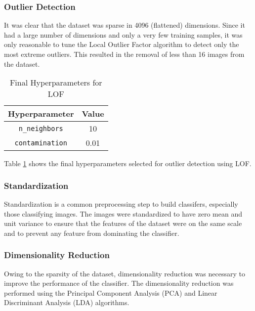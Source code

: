 \documentclass[conference]{IEEEtran}
\begin{document}
    \subsubsection{Outlier Detection}
    \label{sec:outlierdetection}
    It was clear that the dataset was sparse in 4096 (flattened) dimensions.
    Since it had a large number of dimensions and only a very few training samples, it was only reasonable to tune the
    Local Outlier Factor algorithm to detect only the most extreme outliers.
    This resulted in the removal of less than 16 images from the dataset.

    \begin{table}[htbp]
        \caption{Final Hyperparameters for LOF}
        \begin{center}
            \begin{tabular}{|c|c|}
                \hline
                \textbf{Hyperparameter} & \textbf{Value} \\
                \hline
                \texttt{n\_neighbors} & 10 \\
                \hline
                \texttt{contamination} & 0.01 \\
                \hline
            \end{tabular}
            \label{tab:lof}
        \end{center}
    \end{table}

    Table \ref{tab:lof} shows the final hyperparameters selected for outlier detection using LOF.

    \subsubsection{Standardization}
    \label{sec:standardization}
    Standardization is a common preprocessing step to build classifers, especially those classifying images.
    The images were standardized to have zero mean and unit variance to ensure that the features of the
    dataset were on the same scale and to prevent any feature from dominating the classifier.

    \subsubsection{Dimensionality Reduction}
    \label{sec:dimreduction}
    Owing to the sparsity of the dataset, dimensionality reduction was necessary to improve the performance of the classifier.
    The dimensionality reduction was performed using the Principal Component Analysis (PCA) and Linear Discriminant Analysis (LDA) algorithms.
\end{document}

